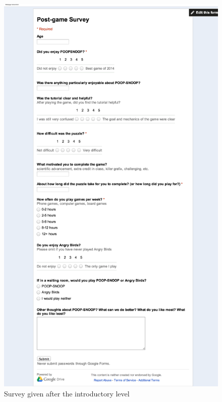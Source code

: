 \documentclass[12pt]{ucthesis}
\begin{document}
\begin{appendices}
{   \begin{figure}[H]
   \centering
   \includegraphics[width=115mm]{images/Post-game.pdf}
   \caption[]{Survey given after the introductory level}
   \end{figure}
}

\end{appendices}
\end{document}
